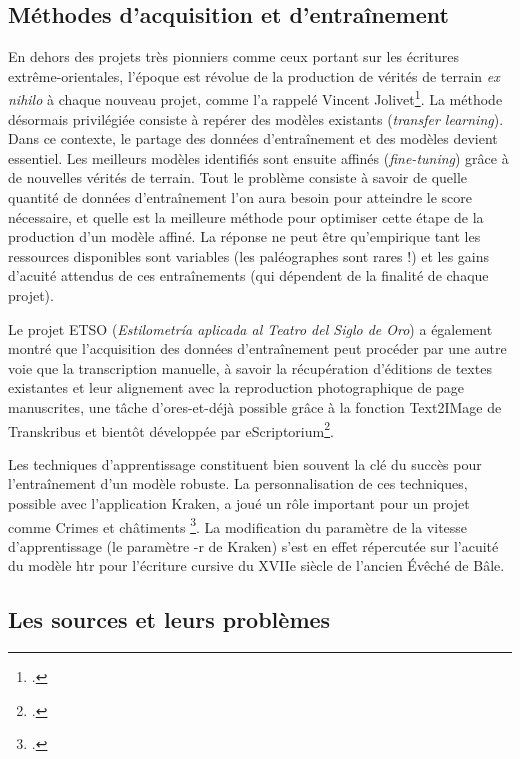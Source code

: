 \documentclass[a4paper,12pt,twoside]{book}
\begin{document}
			\subsection{Méthodes d'acquisition et d'entraînement}
			
				En dehors des projets très pionniers comme ceux portant sur les
				écritures extrême-orientales, l'époque est révolue de la production de
				vérités de terrain \textit{ex nihilo} à chaque nouveau projet, comme l'a
				rappelé Vincent Jolivet\footcite{torresaguilarModelisationAffinageHTR2022}.
				La méthode désormais privilégiée consiste à repérer des modèles
				existants (\textit{transfer learning}). Dans ce contexte, le partage des
				données d'entraînement et des modèles devient essentiel. Les meilleurs
				modèles identifiés sont ensuite affinés (\textit{fine-tuning}) grâce à de
				nouvelles vérités de terrain. Tout le problème consiste à savoir de
				quelle quantité de données d'entraînement l'on aura besoin pour
				atteindre le score nécessaire, et quelle est la meilleure méthode pour
				optimiser cette étape de la production d'un modèle affiné. La réponse ne
				peut être qu'empirique tant les ressources disponibles sont variables
				(les paléographes sont rares !) et les gains d'acuité attendus de ces
				entraînements (qui dépendent de la finalité de chaque projet).
				
				Le projet ETSO (\textit{Estilometría aplicada al Teatro del Siglo de Oro})
				a également montré que l'acquisition des données d'entraînement peut
				procéder par une autre voie que la transcription manuelle, à savoir la
				récupération d'éditions de textes existantes et leur alignement avec la
				reproduction photographique de page manuscrites, une tâche
				d'ores-et-déjà possible grâce à la fonction Text2IMage de Transkribus et
				bientôt développée par eScriptorium\footcite{cuellarModeleOuvertPour2022}.
				
				Les techniques d'apprentissage constituent bien souvent la clé du succès
				pour l'entraînement d'un modèle robuste. La personnalisation de ces
				techniques, possible avec l'application Kraken, a joué un rôle important
				pour un projet comme \og Crimes et châtiments \fg{} \footcite{paupeCursive17eSiecle2022}. La modification du paramètre de la
				vitesse d'apprentissage (le paramètre \textsf{-r}  de Kraken) s'est en effet
				répercutée sur l'acuité du modèle \gls{htr} pour l'écriture cursive du XVIIe
				siècle de l'ancien Évêché de Bâle.
			
			\subsection{Les sources et leurs problèmes}
			
\end{document}
